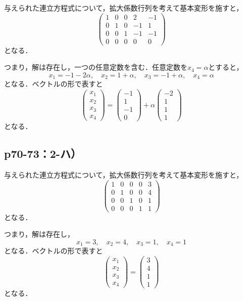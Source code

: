 \documentclass[uplatex,dvipdfmx,a4paper,11pt,fleqn]{jsarticle}
\begin{document}
\begin{tleftbar}
    与えられた連立方程式について，拡大係数行列を考えて基本変形を施すと，
    \[
        \begin{pmatrix} 1 & 0 & 0  & 2 & -1 \\ 0 & 1& 0  & -1 & 1 \\ 0 & 0 & 1 & -1 & -1 \\ 0 & 0 & 0 & 0 & 0 \end{pmatrix}
    \]
    となる．

    つまり，解は存在し，一つの任意定数を含む．任意定数を$x_4 = \alpha$とすると，
    \[
        x_1 = -1 -2\alpha   , \quad x_2 =1+\alpha  , \quad x_3 =-1+ \alpha  , \quad x_4 = \alpha 
    \]
    となる．ベクトルの形で表すと
    \[
        \begin{pmatrix} x_1 \\ x_2 \\ x_3 \\ x_4  \end{pmatrix}= \begin{pmatrix} -1 \\ 1 \\ -1 \\ 0 \end{pmatrix} +\alpha \begin{pmatrix} -2 \\ 1\\ 1 \\ 1\end{pmatrix}
    \]
    となる．
\end{tleftbar}

\newpage 

\subsection*{p70-73：2-ハ）}

\begin{tleftbar}
    与えられた連立方程式について，拡大係数行列を考えて基本変形を施すと，
    \[
        \begin{pmatrix} 1 & 0 & 0  & 0 & 3 \\ 0 & 1& 0  & 0 & 4 \\ 0 & 0 & 1 & 0 & 1 \\ 0 & 0 & 0 & 1 & 1 \end{pmatrix}
    \]
    となる．

    つまり，解は存在し，
    \[
        x_1 = 3 , \quad x_2 =4 , \quad x_3 = 1 , \quad x_4 = 1
    \]
    となる．ベクトルの形で表すと
    \[
        \begin{pmatrix} x_1 \\ x_2 \\ x_3 \\ x_4 \end{pmatrix}= \begin{pmatrix} 3 \\ 4 \\ 1 \\ 1 \end{pmatrix} 
    \]
    となる．
\end{tleftbar}
\end{document}
